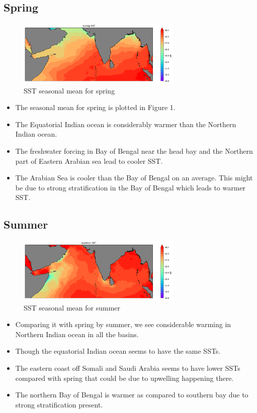 \documentclass[20pt]{article}
\begin{document}
\subsection*{Spring}

\begin{figure}
    \centering
    \includegraphics[width=0.7\textwidth]{spring_sst.png}
    \caption{SST seasonal mean for spring}
\end{figure}

\begin{itemize}
    \item The seasonal mean for spring is plotted in Figure 1. 
    \item The Equatorial Indian ocean is considerably warmer than the Northern Indian ocean.
    \item The freshwater forcing in Bay of Bengal near the head bay and the Northern part of Eastern Arabian sea lead to cooler SST.
    \item The Arabian Sea is cooler than the Bay of Bengal on an average. This might be due to strong stratification in the Bay of Bengal which leads to warmer SST.
\end{itemize}

\subsection*{Summer}

\begin{figure}
    \centering
    \includegraphics[width=0.7\textwidth]{summer_sst.png}
    \caption{SST seasonal mean for summer}
\end{figure}

\begin{itemize}
    \item Comparing it with spring by summer, we see considerable warming in Northern Indian ocean in all the basins.
    \item Though the equatorial Indian ocean seems to have the same SSTs.
    \item The eastern coast off Somali and Saudi Arabia seems to have lower SSTs compared with spring that could be due to upwelling happening there.
    \item The northern Bay of Bengal is warmer as compared to southern bay due to strong stratification present.
\end{itemize}
\end{document}
